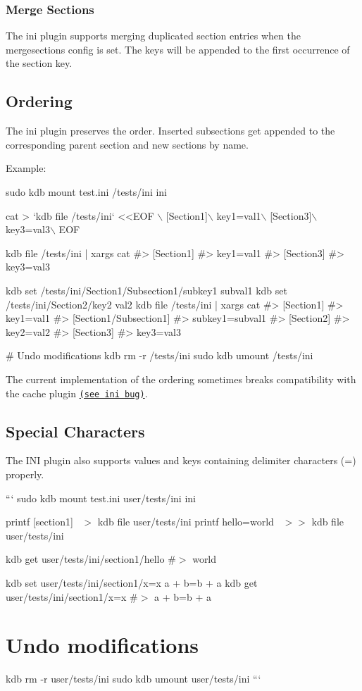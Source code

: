 \subsubsection*{Merge Sections}

The ini plugin supports merging duplicated section entries when the {\ttfamily mergesections} config is set. The keys will be appended to the first occurrence of the section key.

\subsection*{Ordering}

The ini plugin preserves the order. Inserted subsections get appended to the corresponding parent section and new sections by name.

Example\+:


\begin{DoxyCode}
sudo kdb mount test.ini /tests/ini ini

cat > `kdb file /tests/ini` <<EOF \(\backslash\)
[Section1]\(\backslash\)
key1=val1\(\backslash\)
[Section3]\(\backslash\)
key3=val3\(\backslash\)
EOF

kdb file /tests/ini | xargs cat
#> [Section1]
#> key1=val1
#> [Section3]
#> key3=val3

kdb set /tests/ini/Section1/Subsection1/subkey1 subval1
kdb set /tests/ini/Section2/key2 val2
kdb file /tests/ini | xargs cat
#> [Section1]
#> key1=val1
#> [Section1/Subsection1]
#> subkey1=subval1
#> [Section2]
#> key2=val2
#> [Section3]
#> key3=val3

# Undo modifications
kdb rm -r /tests/ini
sudo kdb umount /tests/ini
\end{DoxyCode}


The current implementation of the ordering sometimes breaks compatibility with the cache plugin \href{https://github.com/ElektraInitiative/libelektra/issues/2592}{\tt (see ini bug)}.

\subsection*{Special Characters}

The I\+NI plugin also supports values and keys containing delimiter characters ({\ttfamily =}) properly.

``` sudo kdb mount test.\+ini user/tests/ini ini

printf \textquotesingle{}\mbox{[}section1\mbox{]}~\newline
\textquotesingle{} $>$ {\ttfamily kdb file user/tests/ini} printf \textquotesingle{}hello=world~\newline
\textquotesingle{} $>$$>$ {\ttfamily kdb file user/tests/ini}

kdb get user/tests/ini/section1/hello \#$>$ world

kdb set user/tests/ini/section1/x=x \textquotesingle{}a + b=b + a\textquotesingle{} kdb get user/tests/ini/section1/x=x \#$>$ a + b=b + a

\section*{Undo modifications}

kdb rm -\/r user/tests/ini sudo kdb umount user/tests/ini ``` 